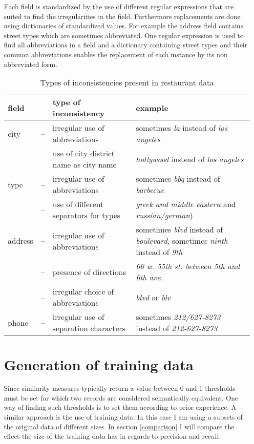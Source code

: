 \documentclass[conference]{IEEEtran}
\begin{document}
Each field is standardized by the use of different regular expressions that are suited to find the irregularities in the field. Furthermore replacements are done using dictionaries of standardized values. For example the address field contains street types which are sometimes abbreviated. One regular expression is used to find all abbreviations in a field and a dictionary containing street types and their common abbreviations enables the replacement of each instance by its non abbreviated form.

\begin{table}
	\begin{tabularx}{\columnwidth}{lr@{ }XX}
	\toprule
	field &&type of inconsistency & example \\
	\midrule
	city & --&irregular use of abbreviations & sometimes \emph{la} instead of \emph{los angeles}\\
		 & --& use of city district name as city name& \emph{hollywood} instead of \emph{los angeles}\\
	\midrule
	type & --& irregular use of abbreviations  & sometimes \emph{bbq} instead of \emph{barbecue}\\
		 & --& use of different separators for types & \emph{greek and middle eastern} and \emph{russian/german})\\
	\midrule
	address & --&irregular use of abbreviations & sometimes \emph{blvd} instead of \emph{boulevard}, sometimes \emph{ninth} instead of \emph{9th}\\
	 & --& presence of directions & \emph{60 w. 55th st. between 5th and 6th ave.}\\
	 & --& irregular choice of abbreviations & \emph{blvd} or \emph{blv}\\
	\midrule
	phone & --& irregular use of separation characters  & sometimes \emph{212/627-8273} instead of \emph{212-627-8273}\\
	\bottomrule
	\end{tabularx}
	\caption{Types of inconsistencies present in restaurant data}\label{rec_faults}
\end{table}

\section{Generation of training data}\label{train_gen}
Since similarity measures typically return a value between 0 and 1 thresholds must be set for which two records are considered semantically equivalent. One way of finding such thresholds is to set them according to prior experience. A similar approach is the use of training data. In this case I am using a subsets of the original data of different sizes. In section \ref{comparison} I will compare the effect the size of the training data has in regards to precision and recall. 
\end{document}
